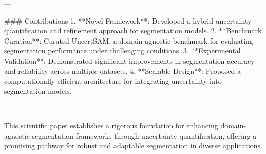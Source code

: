 ---

### Contributions  
1. **Novel Framework**: Developed a hybrid uncertainty quantification and refinement approach for segmentation models.  
2. **Benchmark Curation**: Curated UncertSAM, a domain-agnostic benchmark for evaluating segmentation performance under challenging conditions.  
3. **Experimental Validation**: Demonstrated significant improvements in segmentation accuracy and reliability across multiple datasets.  
4. **Scalable Design**: Proposed a computationally efficient architecture for integrating uncertainty into segmentation models.  

---  

This scientific paper establishes a rigorous foundation for enhancing domain-agnostic segmentation frameworks through uncertainty quantification, offering a promising pathway for robust and adaptable segmentation in diverse applications.